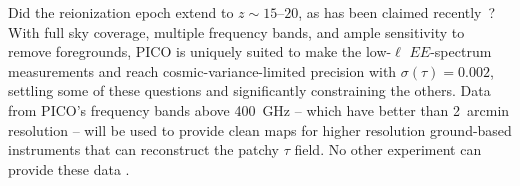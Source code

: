 \documentclass[PICOAPC.tex]{subfiles}
\begin{document}
Did the reionization epoch extend to $z \sim 15$--$20$, as has been claimed recently~\citep{Miranda2017}? With full sky coverage, multiple frequency bands, and ample sensitivity to remove foregrounds, PICO is uniquely suited to make the low-$\ell$ $EE$-spectrum measurements and reach cosmic-variance-limited precision with $\sigma(\tau)=0.002$, settling some of these questions and significantly constraining the others. Data from PICO's frequency bands above 400~GHz -- which have better than 2~arcmin resolution  -- will be used to provide clean maps for higher resolution ground-based instruments that can reconstruct the patchy $\tau$ field. No other experiment can provide these data . 



%
\end{document}
